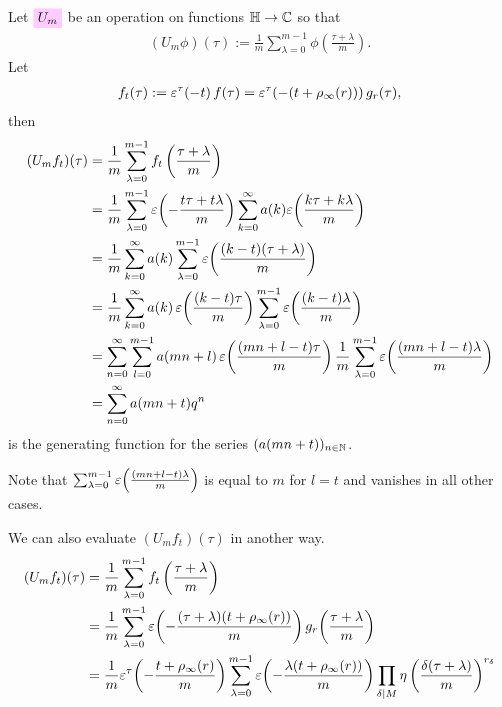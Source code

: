 \documentclass{article}
\begin{document}
Let $\defineNotation[U-m]{U_m}$ be an operation on functions
$\mathbb{H}\to\mathbb{C}$ so that
\begin{gather}
  (U_m\phi)(\tau) := \frac{1}{m}\sum_{\lambda=0}^{m-1}
  \phi\left(\frac{\tau+\lambda}{m}\right).
  \label{eq:U_m}
\end{gather}
Let
\begin{gather}
  f_t(\tau)
  :=\varepsilon^\tau\!\left(-t\right)f(\tau)
  = \varepsilon^\tau\!\left(-(t + \rho_\infty(r))\right) g_r(\tau),
  \label{eq:f_t}
\end{gather}
then
\begin{align}
  (U_mf_t)(\tau)
  &=
  \frac{1}{m} \sum_{\lambda=0}^{m-1}f_t\left(\frac{\tau+\lambda}{m}\right)
  \notag
  \\
  &=
  \frac{1}{m} \sum_{\lambda=0}^{m-1}
  \varepsilon\!\left(-\frac{t\tau+t\lambda}{m}\right)
  \sum_{k=0}^\infty a(k) \varepsilon\!\left(\frac{k\tau+k\lambda}{m}\right)
  \notag
  \\
  &=
  \frac{1}{m}
  \sum_{k=0}^\infty
  a(k)
  \sum_{\lambda=0}^{m-1}
  \varepsilon\!\left(\frac{(k-t)(\tau+\lambda)}{m}\right)
  \notag
  \\
  &=
  \frac{1}{m}
  \sum_{k=0}^\infty
  a(k)\,
  \varepsilon\!\left(\frac{(k-t)\tau}{m}\right)
  \sum_{\lambda=0}^{m-1}
  \varepsilon\!\left(\frac{(k-t)\lambda}{m}\right)
  \notag
  \\
  &=
    \sum_{n=0}^\infty
    \sum_{l=0}^{m-1} a(mn+l)\,
    \varepsilon\!\left(\frac{(mn+l-t)\tau}{m}\right)
    \frac{1}{m}
    \sum_{\lambda=0}^{m-1}\varepsilon\!\left(\frac{(mn+l-t)\lambda}{m}\right)
    \notag
  \\
  &=
    \sum_{n=0}^\infty a(mn+t) q^n
  \label{eq:U_m-f_t}
\end{align}
is the generating function for the series
$(a(mn+t))_{n\in\mathbb{N}}$.


Note that
$\sum_{\lambda=0}^{m-1}\varepsilon\!\left(\frac{(mn+l-t)\lambda}{m}\right)$ is
equal to $m$ for $l=t$ and vanishes in all other cases.

We can also evaluate $(U_mf_t)(\tau)$ in another way.
%
\begin{align*}
  (U_mf_t)(\tau)
  &=
  \frac{1}{m} \sum_{\lambda=0}^{m-1}f_t\left(\frac{\tau+\lambda}{m}\right)\\
  &=
    \frac{1}{m} \sum_{\lambda=0}^{m-1}
    \varepsilon\!\left(-\frac{(\tau+\lambda) (t + \rho_\infty(r))}{m}\right)
    g_r\!\left(\frac{\tau+\lambda}{m}\right)
  \\
  &=
  \frac{1}{m}
  \varepsilon^\tau\!\left(-\frac{t+\rho_\infty(r)}{m}\right)
  \sum_{\lambda=0}^{m-1}
  \varepsilon\!\left(-\frac{\lambda (t+\rho_\infty(r))}{m}\right)
  \prod_{\delta \mid M}
    \eta\left(\frac{\delta(\tau+\lambda)}{m}\right)^{r_\delta}
\end{align*}
\end{document}
